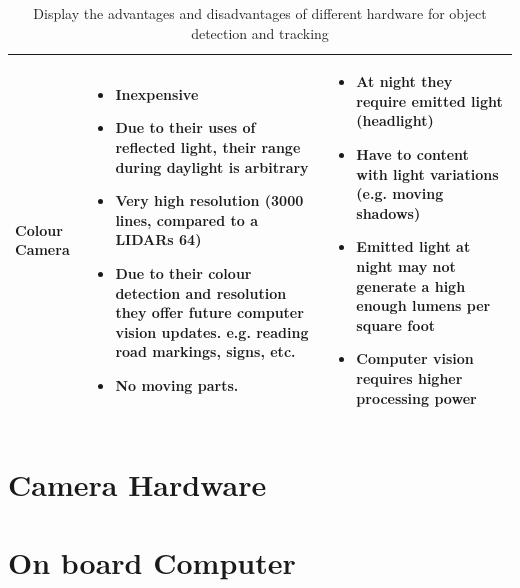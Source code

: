 \documentclass[a4paper]{report}
\begin{document}
\begin{table}[h]
{\begin{minipage}{\textwidth}
\begin{tabular}{ | m{3cm} | p{5cm} | p{5cm} |}
  Colour Camera &
  \begin{itemize}[leftmargin=*]   
    \item Inexpensive
    \item Due to their uses of reflected light, their range during daylight is arbitrary     	
    \item Very high resolution (3000 lines, compared to a LIDARs 64)    	
    \item Due to their colour detection and resolution they offer future computer vision updates. e.g. reading road markings, signs, etc.    	
    \item No moving parts.
  \end{itemize} &
  \begin{itemize}[leftmargin=*]   
    \item At night they require emitted light (headlight)
    \item Have to content with light variations (e.g. moving shadows)
    \item Emitted light at night may not generate a high enough lumens per square foot
    \item Computer vision requires higher processing power      
  \end{itemize} \\ \hline    
\end{tabular}


\caption[Table caption text]{Display the advantages and disadvantages of different hardware for object detection and tracking} 
\label{table:detect_hardware_comp}
\end{minipage} }
\end{table}

\section{Camera Hardware}

\section{On board Computer}
\label{sec:computer}
\end{document}
